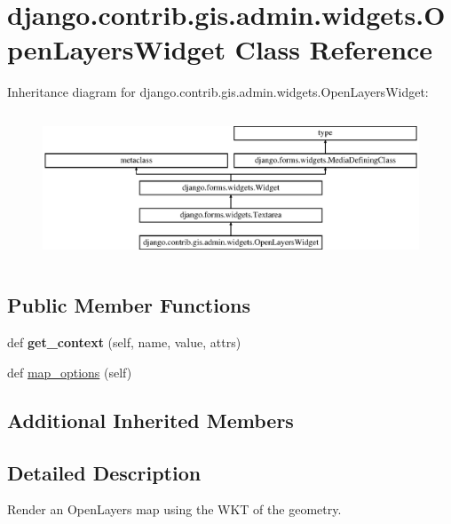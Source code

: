 \hypertarget{classdjango_1_1contrib_1_1gis_1_1admin_1_1widgets_1_1_open_layers_widget}{}\section{django.\+contrib.\+gis.\+admin.\+widgets.\+Open\+Layers\+Widget Class Reference}
\label{classdjango_1_1contrib_1_1gis_1_1admin_1_1widgets_1_1_open_layers_widget}
Inheritance diagram for django.\+contrib.\+gis.\+admin.\+widgets.\+Open\+Layers\+Widget\+:\begin{figure}[H]
\begin{center}
\leavevmode
\includegraphics[height=4.430379cm]{classdjango_1_1contrib_1_1gis_1_1admin_1_1widgets_1_1_open_layers_widget}
\end{center}
\end{figure}
\subsection*{Public Member Functions}
\begin{DoxyCompactItemize}
\item 
\mbox{\label{classdjango_1_1contrib_1_1gis_1_1admin_1_1widgets_1_1_open_layers_widget_a72b3abb87e83914fead933d31cee3703}} 
def {\bfseries get\+\_\+context} (self, name, value, attrs)
\item 
def \mbox{\hyperlink{classdjango_1_1contrib_1_1gis_1_1admin_1_1widgets_1_1_open_layers_widget_a4c4b479d4f823874b55ca4c5b3dacc96}{map\+\_\+options}} (self)
\end{DoxyCompactItemize}
\subsection*{Additional Inherited Members}


\subsection{Detailed Description}
\begin{DoxyVerb}Render an OpenLayers map using the WKT of the geometry.
\end{DoxyVerb}
 

